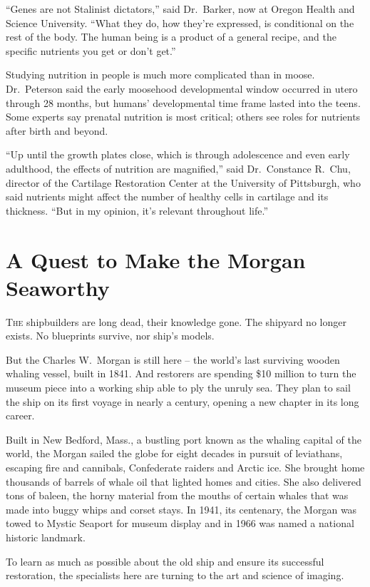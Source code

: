 ﻿\documentclass[12pt]{article}
\begin{document}
``Genes are not Stalinist dictators,'' said Dr.~Barker, now at Oregon Health and Science University.
``What they do, how they're expressed, is conditional on the rest of the body. The human being is a
product of a general recipe, and the specific nutrients you get or don't get.''

Studying nutrition in people is much more complicated than in moose. Dr.~Peterson said the early
moosehood developmental window occurred in utero through 28 months, but humans' developmental time
frame lasted into the teens. Some experts say prenatal nutrition is most critical; others see roles
for nutrients after birth and beyond.

``Up until the growth plates close, which is through adolescence and even early adulthood, the
effects of nutrition are magnified,'' said Dr.~Constance R.~Chu, director of the Cartilage
Restoration Center at the University of Pittsburgh, who said nutrients might affect the number of
healthy cells in cartilage and its thickness. ``But in my opinion, it's relevant throughout life.''

\section{A Quest to Make the Morgan Seaworthy}

\lettrine{T}{he} shipbuilders are long dead, their knowledge gone. The
shipyard no longer exists. No blueprints survive, nor ship's models.

But the Charles W.~Morgan is still here -- the world's last surviving wooden whaling vessel, built
in 1841. And restorers are spending \$10 million to turn the museum piece into a working ship able
to ply the unruly sea. They plan to sail the ship on its first voyage in nearly a century, opening a
new chapter in its long career.

Built in New Bedford, Mass., a bustling port known as the whaling capital of the world, the Morgan
sailed the globe for eight decades in pursuit of leviathans, escaping fire and cannibals,
Confederate raiders and Arctic ice. She brought home thousands of barrels of whale oil that lighted
homes and cities. She also delivered tons of baleen, the horny material from the mouths of certain
whales that was made into buggy whips and corset stays. In 1941, its centenary, the Morgan was towed
to Mystic Seaport for museum display and in 1966 was named a national historic landmark.

To learn as much as possible about the old ship and ensure its successful restoration, the
specialists here are turning to the art and science of imaging.
\end{document}
